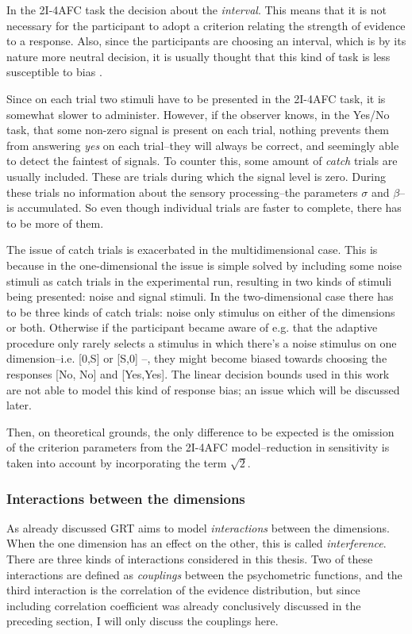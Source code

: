 \documentclass{article}\usepackage{knitr}
\begin{document}
In the 2I-4AFC task the decision about the \textit{interval}. This means that it is not necessary for the participant to adopt a criterion relating the strength of evidence to a response. Also, since the participants are choosing an interval, which is by its nature more neutral decision, it is usually thought that this kind of task is less susceptible to bias \citep[Chapter 6]{kingdomprins2010}.

Since on each trial two stimuli have to be presented in the 2I-4AFC task, it is somewhat slower to administer. However, if the observer knows, in the Yes/No task, that some non-zero signal is present on each trial, nothing prevents them from answering \textit{yes} on each trial--they will always be correct, and seemingly able to detect the faintest of signals. To counter this, some amount of \textit{catch} trials are usually included. These are trials during which the signal level is zero. During these trials no information about the sensory processing--the parameters $\sigma$ and $\beta$--is accumulated. So even though individual trials are faster to complete, there has to be more of them. 

The issue of catch trials is exacerbated in the multidimensional case. This is because in the one-dimensional the issue is simple solved by including some noise stimuli as catch trials in the experimental run, resulting in two kinds of stimuli being presented: noise and signal stimuli. In the two-dimensional case there has to be three kinds of catch trials: noise only stimulus on either of the dimensions or both. Otherwise if the participant became aware of e.g. that the adaptive procedure only rarely selects a stimulus in which there's a noise stimulus on one dimension--i.e. [0,S] or [S,0] --, they might become biased towards choosing the responses [No, No] and [Yes,Yes]. The linear decision bounds used in this work are not able to model this kind of response bias; an issue which will be discussed later. 

Then, on theoretical grounds, the only difference to be expected is the omission of the criterion parameters from the 2I-4AFC model--reduction in sensitivity is taken into account by incorporating the term $\sqrt{2}$. 

\subsubsection{Interactions between the dimensions}

As already discussed GRT aims to model \textit{interactions} between the dimensions. When the one dimension has an effect on the other, this is called \textit{interference}. There are three kinds of interactions considered in this thesis. Two of these interactions are defined as \textit{couplings} between the psychometric functions, and the third interaction is the correlation of the evidence distribution, but since including correlation coefficient was already conclusively discussed in the preceding section, I will only discuss the couplings here.
\end{document}
